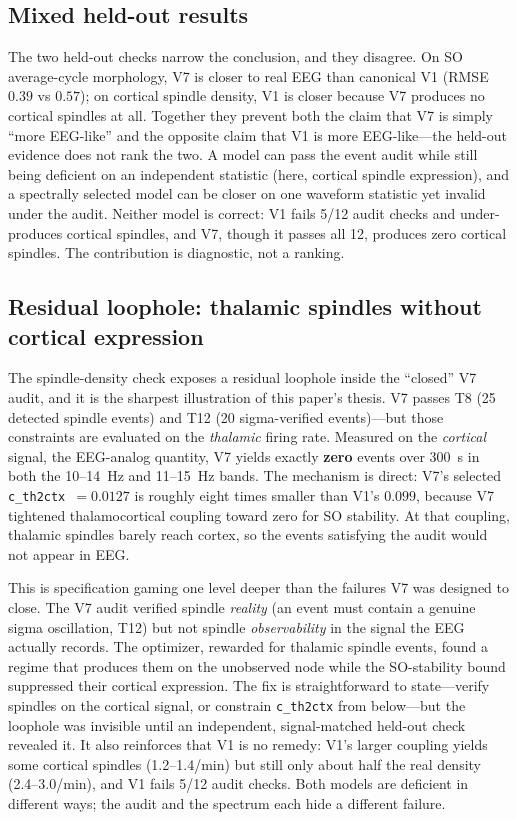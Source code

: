 \documentclass[conference]{IEEEtran}
\newcommand{\code}[1]{\texttt{#1}}
\begin{document}
\subsection{Mixed held-out results}
The two held-out checks narrow the conclusion, and they disagree. On SO
average-cycle morphology, V7 is closer to real EEG than canonical V1 (RMSE
$0.39$ vs $0.57$); on cortical spindle density, V1 is closer because V7 produces
no cortical spindles at all. Together they prevent both the claim that V7 is
simply ``more EEG-like'' and the opposite claim that V1 is more EEG-like---the
held-out evidence does not rank the two. A model can pass the event audit while
still being deficient on an independent statistic (here, cortical spindle
expression), and a spectrally selected model can be closer on one waveform
statistic yet invalid under the audit. Neither model is correct: V1 fails 5/12
audit checks and under-produces cortical spindles, and V7, though it passes all
12, produces zero cortical spindles. The contribution is diagnostic, not a
ranking.

\subsection{Residual loophole: thalamic spindles without cortical expression}
\label{sec:residual}
The spindle-density check exposes a residual loophole inside the ``closed'' V7
audit, and it is the sharpest illustration of this paper's thesis. V7 passes T8
(25 detected spindle events) and T12 (20 sigma-verified events)---but those
constraints are evaluated on the \emph{thalamic} firing rate. Measured on the
\emph{cortical} signal, the EEG-analog quantity, V7 yields exactly \textbf{zero}
events over 300~s in both the 10--14~Hz and 11--15~Hz bands. The mechanism is
direct: V7's selected \code{c\_th2ctx}~$=0.0127$ is roughly eight times smaller
than V1's $0.099$, because V7 tightened thalamocortical coupling toward zero for
SO stability. At that coupling, thalamic spindles barely reach cortex, so the
events satisfying the audit would not appear in EEG.

This is specification gaming one level deeper than the failures V7 was designed
to close. The V7 audit verified spindle \emph{reality} (an event must contain a
genuine sigma oscillation, T12) but not spindle \emph{observability} in the
signal the EEG actually records. The optimizer, rewarded for thalamic spindle
events, found a regime that produces them on the unobserved node while the
SO-stability bound suppressed their cortical expression. The fix is
straightforward to state---verify spindles on the cortical signal, or constrain
\code{c\_th2ctx} from below---but the loophole was invisible until an
independent, signal-matched held-out check revealed it. It also reinforces that
V1 is no remedy: V1's larger coupling yields some cortical spindles
(1.2--1.4/min) but still only about half the real density (2.4--3.0/min), and V1
fails 5/12 audit checks. Both models are deficient in different ways; the audit
and the spectrum each hide a different failure.
\end{document}
